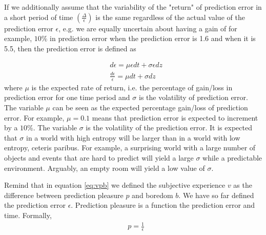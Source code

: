 \documentclass[11pt, onecolumn]{article}
\begin{document}
If we additionally assume that the variability of the "return" of prediction error in a short period of time $(\frac{\Delta}{\epsilon})$ is the same regardless of the actual value of the prediction error $\epsilon$, e.g. we are equally uncertain about having a gain of for example, $10\%$ in prediction error when the prediction error is 1.6 and when it is 5.5, then the prediction error is defined as

\begin{equation}
\begin{split}
& d \epsilon= \mu \epsilon dt + \sigma \epsilon dz \\
& \frac{d \epsilon}{\epsilon}= \mu dt + \sigma dz
\end{split}
\label{eq:wiener}
\end{equation}
where $\mu$ is the expected rate of return, i.e. the percentage of gain/loss in prediction error for one time period and $\sigma$ is the volatility of prediction error.
The variable $\mu$ can be seen as the expected percentage gain/loss of prediction error. For example, $\mu = 0.1$ means that prediction error is expected to increment by a $10\%$. The variable $\sigma$ is the volatility of the prediction error. It is expected that $\sigma$ in a world with high entropy will be larger than in a world with low entropy, ceteris paribus. For example, a surprising world with a large number of objects and events that are hard to predict will yield a large $\sigma$ while a predictable environment. Arguably, an empty room will yield a low value of $\sigma$. 

Remind that in equation \ref{eq:vpb} we defined the subjective experience $v$ as the difference between prediction pleasure $p$ and boredom $b$. We have so far defined the prediction error $\epsilon$. Prediction pleasure is a function the prediction error and time. Formally, 
\begin{equation}
\begin{split}
& p = \frac{1}{\epsilon} \\
\end{split}
\label{eq:pinve}
\end{equation}
\end{document}
